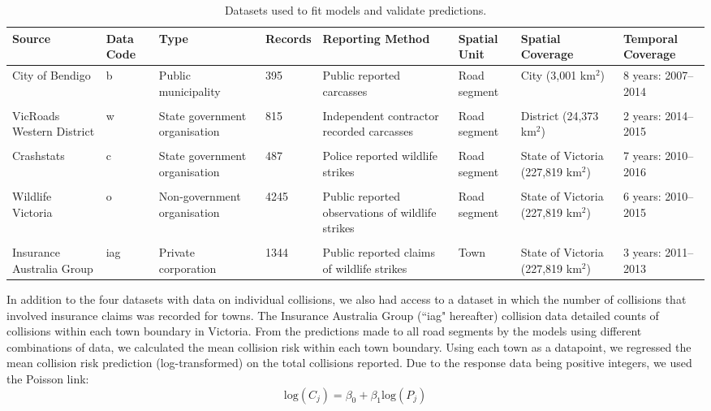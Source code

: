 \begin{table}[!t]
\caption[Datasets used to fit collision models and validate predictions]{Datasets used to fit models and validate predictions.}
\centering
\begin{tabularx}{0.9\textwidth}{YYYlYYYY} \toprule
Source						&Data Code	&Type	&Records	&Reporting Method	&Spatial Unit	&Spatial Coverage	&Temporal Coverage \\ \midrule

City of Bendigo		&b		&Public municipality			&395		&Public reported carcasses			&Road segment		&City (3,001 km$^2$)	&8 years: 2007--2014 \\

&&&&&&\\

VicRoads Western District	&w		&State government organisation	&815		&Independent contractor recorded  carcasses			&Road segment		&District (24,373 km$^2$)	&2 years: 2014--2015 \\

&&&&&&\\

Crashstats		&c			&State government organisation	&487		&Police reported wildlife strikes			&Road segment		&State of Victoria (227,819 km$^2$)	&7 years: 2010--2016 \\

&&&&&&\\

Wildlife Victoria	&o		&Non-government organisation	&4245		&Public reported observations of wildlife strikes			&Road segment		&State of Victoria (227,819 km$^2$)	&6 years: 2010--2015 \\

&&&&&&\\

Insurance Australia Group	&iag	&Private corporation			&1344		&Public reported claims of wildlife strikes			&Town		&State of Victoria (227,819 km$^2$)	&3 years: 2011--2013 \\

\bottomrule
\end{tabularx}
\label{val_data}
\end{table}


In addition to the four datasets with data on individual collisions, we also had access to a dataset in which the number of collisions that involved insurance claims was recorded for towns. The Insurance Australia Group (``iag" hereafter) collision data detailed counts of collisions within each town boundary in Victoria. From the predictions made to all road segments by the models using different combinations of data, we calculated the mean collision risk within each town boundary. Using each town as a datapoint, we regressed the mean collision risk prediction (log-transformed) on the total collisions reported. Due to the response data being positive integers, we used the Poisson link:
\begin{equation} \label{eq:62}
\text{log}(C_j) = \beta_0 + \beta_1\text{log}(P_j)
\end{equation}

